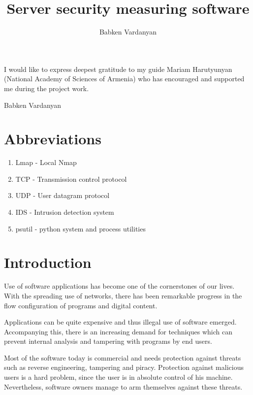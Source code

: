 \documentclass[a4paper,12pt]{article}
\author{Babken Vardanyan}
\title{Server security measuring software}
\date{}
\begin{document}
\maketitle
\newpage

I would like to express deepest gratitude to my guide Mariam Harutyunyan
(National Academy of Sciences of Armenia) who has encouraged and
supported me during the project work.

\hfill \hfill Babken Vardanyan

\newpage

\tableofcontents
\newpage

\section{Abbreviations}

\begin{enumerate}
\item Lmap - Local Nmap
\item TCP - Transmission control protocol
\item UDP - User datagram protocol
\item IDS - Intrusion detection system
\item psutil - python system and process utilities
\end{enumerate}

\section{Introduction}






Use of software applications has become one of the cornerstones of our lives.
With the spreading use of networks, there has been remarkable progress in the
flow configuration of programs and digital content.

Applications can be quite expensive and thus illegal use of software emerged.
Accompanying this, there is an increasing demand for techniques which can
prevent internal analysis and tampering with programs by end users.

Most of the software today is commercial and needs protection against threats
such as reverse engineering, tampering and piracy. Protection against
malicious users is a hard problem, since the user is in absolute control of
his machine. Nevertheless, software owners manage to arm themselves against
these threats.
\end{document}
